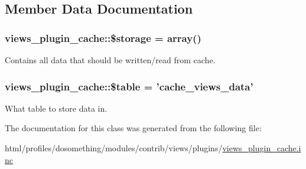\subsection{Member Data Documentation}
\hypertarget{classviews__plugin__cache_adedb6ce98b20d56856176eb732887c89}{
\subsubsection[{\$storage}]{\setlength{\rightskip}{0pt plus 5cm}views\_\-plugin\_\-cache::\$storage = array()}}
\label{classviews__plugin__cache_adedb6ce98b20d56856176eb732887c89}
Contains all data that should be written/read from cache. \hypertarget{classviews__plugin__cache_ab87d5a0d212d539d19825a26e88fc070}{
\subsubsection[{\$table}]{\setlength{\rightskip}{0pt plus 5cm}views\_\-plugin\_\-cache::\$table = 'cache\_\-views\_\-data'}}
\label{classviews__plugin__cache_ab87d5a0d212d539d19825a26e88fc070}
What table to store data in. 

The documentation for this class was generated from the following file:\begin{DoxyCompactItemize}
\item 
html/profiles/dosomething/modules/contrib/views/plugins/\hyperlink{views__plugin__cache_8inc}{views\_\-plugin\_\-cache.inc}\end{DoxyCompactItemize}
